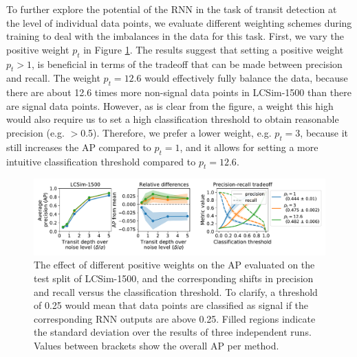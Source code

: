 To further explore the potential of the RNN in the task of transit detection at the level of individual data points, we evaluate different weighting schemes during training to deal with the imbalances in the data for this task. First, we vary the positive weight $p_t$ in Figure \ref{fig:lcsim_weight_p}. The results suggest that setting a positive weight $p_t > 1$, is beneficial in terms of the tradeoff that can be made between precision and recall. The weight $p_t=12.6$ would effectively fully balance the data, because there are about 12.6 times more non-signal data points in LCSim-1500 than there are signal data points. However, as is clear from the figure, a weight this high would also require us to set a high classification threshold to obtain reasonable precision (e.g. $>$0.5). Therefore, we prefer a lower weight, e.g. $p_t = 3$, because it still increases the AP compared to $p_t = 1$, and it allows for setting a more intuitive classification threshold compared to $p_t = 12.6$.
\begin{figure}
    \centering
    \includegraphics[width=0.95\linewidth]{Experiments/Figures/Models/lcsim1500_AP_weighting-p.pdf}
    \caption{The effect of different positive weights on the AP evaluated on the test split of LCSim-1500, and the corresponding shifts in precision and recall versus the classification threshold. To clarify, a threshold of 0.25 would mean that data points are classified as signal if the corresponding RNN outputs are above 0.25. Filled regions indicate the standard deviation over the results of three independent runs. Values between brackets show the overall AP per method.}
    \label{fig:lcsim_weight_p}
\end{figure}

